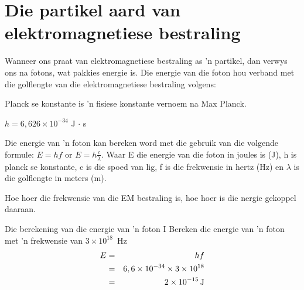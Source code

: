             \section{Die partikel aard van elektromagnetiese bestraling}
            \nopagebreak
      \label{m38778*id188832} Wanneer ons praat van elektromagnetiese bestraling as 'n partikel, dan verwys ons na fotons, wat pakkies energie is. Die energie van die foton hou verband met die golflengte van die elektromagnetiese bestraling volgens:\par 
\label{m38778*fhsst!!!underscore!!!id476} { \label{m38778*meaningfhsst!!!underscore!!!id476}
      \label{m38778*id188843}Planck se konstante is 'n fisiese konstante vernoem na Max Planck.\par 
      \label{m38778*id188849}$h=6,626\ensuremath{\times}{10}^{-34}$ J $\ensuremath{\cdot}$ s
 \par 
       } 
      \label{m38778*id188898} Die energie van 'n foton kan bereken word met die gebruik van die volgende formule: $E=hf$ or $E=h\frac{c}{\lambda }$.
Waar E die energie van die foton in joules is (J), h is planck se konstante, c is die spoed van lig, f is die frekwensie in hertz (Hz) en $\lambda $ is die golflengte in meters (m).\par Hoe hoer die frekwensie van die EM bestraling is, hoe hoer is die nergie gekoppel daaraan.  
      \begin{wex}
      {Die berekening van die energie van 'n foton I
      }
      {
      \label{m38778*id188962} Bereken die energie van 'n foton met 'n frekwensie van $3\ensuremath{\times}{10}^{18}$~Hz}
      {
    \begin{eqnarray}
    E& =& hf\\ 
     & =& 6,6\ensuremath{\times}{10}^{-34}\ensuremath{\times}3\ensuremath{\times}{10}^{18}\\ 
     & =& 2\ensuremath{\times}{10}^{-15}\phantom{\rule{0.166667em}{0ex}}\text{J}
     \end{eqnarray}
      }
      \end{wex}
    
